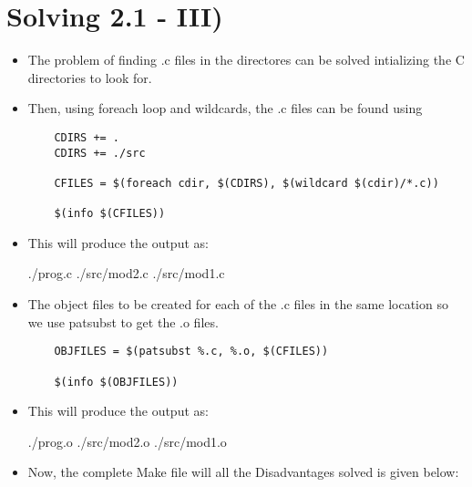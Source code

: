 \documentclass{article}
\begin{document}
\section{Solving 2.1 - III)}
\begin{itemize}
    \item The problem of finding .c files in the directores can be solved intializing the C directories to look for.
    \item Then, using foreach loop and wildcards, the .c files can be found using
          \begin{verbatim}
    CDIRS += .
    CDIRS += ./src
    
    CFILES = $(foreach cdir, $(CDIRS), $(wildcard $(cdir)/*.c))

    $(info $(CFILES))
    \end{verbatim}
    \item This will produce the output as:
          \begin{framed}
              ./prog.c  ./src/mod2.c ./src/mod1.c
          \end{framed}
    \item The object files to be created for each of the .c files in the same location so we use patsubst to get the .o files.
          \begin{verbatim}
    OBJFILES = $(patsubst %.c, %.o, $(CFILES))

    $(info $(OBJFILES))
    \end{verbatim}
    \item This will produce the output as:
          \begin{framed}
              ./prog.o  ./src/mod2.o  ./src/mod1.o
          \end{framed}
    \item Now, the complete Make file will all the Disadvantages solved is given below:
\end{itemize}
\end{document}
